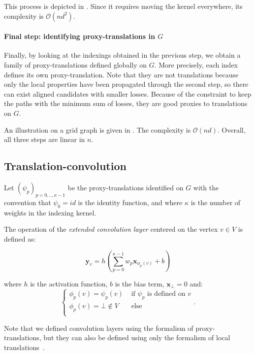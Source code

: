 This process is depicted in . Since it requires moving the kernel everywhere, its complexity is $\mathcal{O}(n d^2)$.



\paragraph{Final step: identifying proxy-translations in $G$}

Finally, by looking at the indexings obtained in the previous step, we obtain a family of proxy-translations defined globally on $G$. More precisely, each index defines its own proxy-translation. Note that they are not translations because only the local properties have been propagated through the second step, so there can exist aligned candidates with smaller losses. Because of the constraint to keep the paths with the minimum sum of losses, they are good proxies to translations on $G$.

An illustration on a grid graph is given in . The complexity is $\mathcal{O}(nd)$. Overall, all three steps are linear in $n$.



\subsection{Translation-convolution}

Let $(\psi_p)_{p=0,..,\kappa-1}$ be the proxy-translations identified on $G$ with the convention that $\psi_0 = id$ is the identity function, and where $\kappa$ is the number of weights in the indexing kernel.

The operation of the \emph{extended convolution layer} centered on the vertex $v \in V$ is defined as:

$$\mathbf{y}_v = h\left(\sum_{p=0}^{\kappa-1}{w_p \mathbf{x}_{\phi_p(v)}} + b\right)$$

where $h$ is the activation function, $b$ is the bias term, $\mathbf{x}_\bot = 0$ and:
$$
\left\{
    \begin{array}{ll}
        \phi_p(v) = \psi_p(v) & \mbox{ if } \psi_p \mbox{ is defined on } v \\
        \phi_p(v) = \bot \notin V & \mbox{ else} \\
    \end{array}
\right..
$$

Note that we defined convolution layers using the formalism of proxy-translations, but they can also be defined using only the formalism of local translations~\cite{pasdeloup2017convolutional}.

